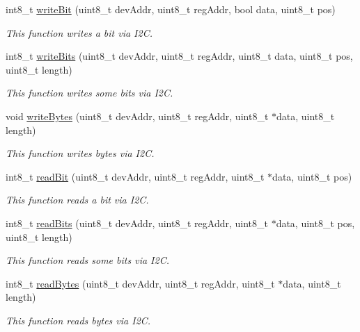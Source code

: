 \begin{DoxyCompactItemize}
\item 
int8\+\_\+t \hyperlink{class_two_wire_ac3ae5db1c5ad782970f57ec50db0a482}{write\+Bit} (uint8\+\_\+t dev\+Addr, uint8\+\_\+t reg\+Addr, bool data, uint8\+\_\+t pos)
\begin{DoxyCompactList}\small\item\em This function writes a bit via I2C. \end{DoxyCompactList}\item 
int8\+\_\+t \hyperlink{class_two_wire_ac2ef260e405e4955285eed3e4af96f1a}{write\+Bits} (uint8\+\_\+t dev\+Addr, uint8\+\_\+t reg\+Addr, uint8\+\_\+t data, uint8\+\_\+t pos, uint8\+\_\+t length)
\begin{DoxyCompactList}\small\item\em This function writes some bits via I2C. \end{DoxyCompactList}\item 
void \hyperlink{class_two_wire_a65aed36b0d20c1a29c70adffeac01348}{write\+Bytes} (uint8\+\_\+t dev\+Addr, uint8\+\_\+t reg\+Addr, uint8\+\_\+t $\ast$data, uint8\+\_\+t length)
\begin{DoxyCompactList}\small\item\em This function writes bytes via I2C. \end{DoxyCompactList}\item 
int8\+\_\+t \hyperlink{class_two_wire_a4a72b6fd3b348406490454ae79c248a7}{read\+Bit} (uint8\+\_\+t dev\+Addr, uint8\+\_\+t reg\+Addr, uint8\+\_\+t $\ast$data, uint8\+\_\+t pos)
\begin{DoxyCompactList}\small\item\em This function reads a bit via I2C. \end{DoxyCompactList}\item 
int8\+\_\+t \hyperlink{class_two_wire_aa345518109c89abe7456a97cdf049c8c}{read\+Bits} (uint8\+\_\+t dev\+Addr, uint8\+\_\+t reg\+Addr, uint8\+\_\+t $\ast$data, uint8\+\_\+t pos, uint8\+\_\+t length)
\begin{DoxyCompactList}\small\item\em This function reads some bits via I2C. \end{DoxyCompactList}\item 
int8\+\_\+t \hyperlink{class_two_wire_a309b244b50c243c0bf27fc6a810c6b46}{read\+Bytes} (uint8\+\_\+t dev\+Addr, uint8\+\_\+t reg\+Addr, uint8\+\_\+t $\ast$data, uint8\+\_\+t length)
\begin{DoxyCompactList}\small\item\em This function reads bytes via I2C. \end{DoxyCompactList}\end{DoxyCompactItemize}
